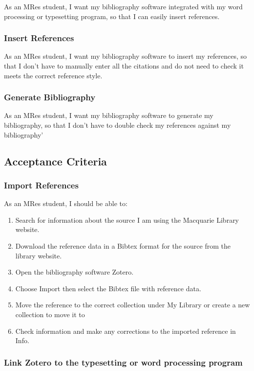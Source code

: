 \documentclass{article}
\begin{document}
As an MRes student, I want my bibliography software integrated with my word processing or typesetting program, so that I can easily insert references.

\subsubsection*{Insert References}

As an MRes student, I want my bibliography software to insert my references, so that I don’t have to manually enter all the citations and do not need to check it meets the correct reference style.

\subsubsection*{Generate Bibliography}

As an MRes student, I want my bibliography software to generate my bibliography, so that I don’t have to double check my references against my bibliography’

\subsection*{Acceptance Criteria}

\subsubsection*{Import References}

As an MRes student, I should be able to:
\begin{enumerate} 
\item Search for information about the source I am using the Macquarie Library website. 
\item Download the reference data in a Bibtex format for the source from the library website. 
\item Open the bibliography software Zotero. 
\item Choose Import then select the Bibtex file with reference data. 
\item Move the reference to the correct collection under My Library or create a new collection to move it to
\item Check information and make any corrections to the imported reference in Info.
\end{enumerate} 

\subsubsection*{Link Zotero to the typesetting or word processing program}
\end{document}
